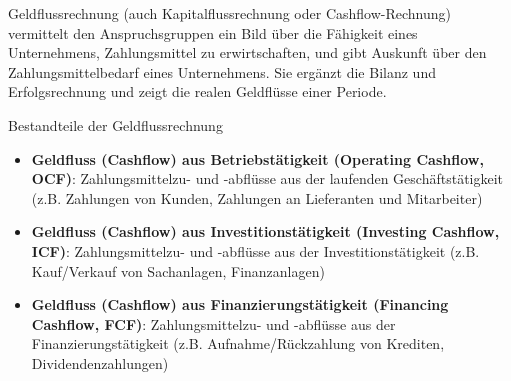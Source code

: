 \begin{definition}{Geldflussrechnung}
    (auch Kapitalflussrechnung oder Cashflow-Rechnung) vermittelt den Anspruchsgruppen ein Bild über die Fähigkeit eines Unternehmens, Zahlungsmittel zu erwirtschaften, und gibt Auskunft über den Zahlungsmittelbedarf eines Unternehmens. Sie ergänzt die Bilanz und Erfolgsrechnung und zeigt die realen Geldflüsse einer Periode.
\end{definition}

\begin{definition}{Bestandteile der Geldflussrechnung}
\begin{itemize}
    \item \textbf{Geldfluss (Cashflow) aus Betriebstätigkeit (Operating Cashflow, OCF)}: Zahlungsmittelzu- und -abflüsse aus der laufenden Geschäftstätigkeit (z.B. Zahlungen von Kunden, Zahlungen an Lieferanten und Mitarbeiter)
    \item \textbf{Geldfluss (Cashflow) aus Investitionstätigkeit (Investing Cashflow, ICF)}: Zahlungsmittelzu- und -abflüsse aus der Investitionstätigkeit (z.B. Kauf/Verkauf von Sachanlagen, Finanzanlagen)
    \item \textbf{Geldfluss (Cashflow) aus Finanzierungstätigkeit (Financing Cashflow, FCF)}: Zahlungsmittelzu- und -abflüsse aus der Finanzierungstätigkeit (z.B. Aufnahme/Rückzahlung von Krediten, Dividendenzahlungen)
\end{itemize}
\end{definition}

